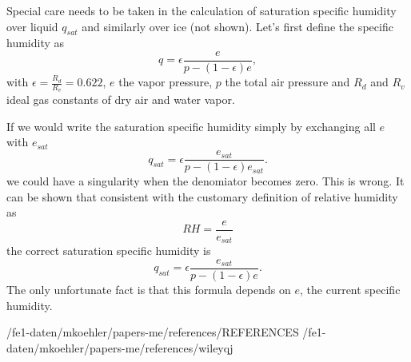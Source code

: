 \documentclass[a4paper,11pt]{article}
\begin{document}
Special care needs to be taken in the calculation of saturation specific humidity 
over liquid $q_{sat}$ and similarly over ice (not shown).  Let's first define the specific humidity as
\begin{equation}
q = \epsilon \frac{e}{p-(1-\epsilon)e} ,
\end{equation}
with $\epsilon=\frac{R_d}{R_v}=0.622$, $e$ the vapor pressure, $p$ the total air pressure and 
$R_d$ and $R_v$ ideal gas constants of dry air and water vapor.

If we would write the saturation specific humidity simply by exchanging all $e$ with $e_{sat}$ 
\begin{equation}
q_{sat} = \epsilon \frac{e_{sat}}{p-(1-\epsilon)e_{sat}}.
\end{equation}
we could have a singularity when the denomiator becomes zero.  This is wrong.  It can be shown 
that consistent with the customary definition of relative humidity as
\begin{equation}
RH = \frac{e}{e_{sat}}
\end{equation}
the correct saturation specific humidity is
\begin{equation}
q_{sat} = \epsilon \frac{e_{sat}}{p-(1-\epsilon)e}.
\end{equation}
The only unfortunate fact is that this formula depends on $e$, the current specific humidity. 



 {/fe1-daten/mkoehler/papers-me/references/REFERENCES}
 {/fe1-daten/mkoehler/papers-me/references/wileyqj} %
\end{document}
